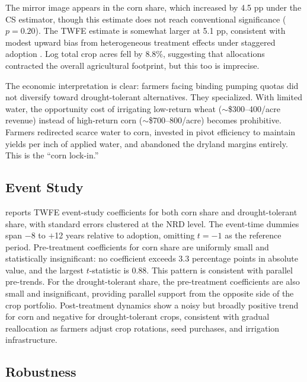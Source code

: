 \documentclass[12pt]{article}
\begin{document}
The mirror image appears in the corn share, which increased by 4.5 pp under the CS estimator, though this estimate does not reach conventional significance ($p = 0.20$). The TWFE estimate is somewhat larger at 5.1 pp, consistent with modest upward bias from heterogeneous treatment effects under staggered adoption \citep{goodmanbacon2021difference}. Log total crop acres fell by 8.8\%, suggesting that allocations contracted the overall agricultural footprint, but this too is imprecise.

The economic interpretation is clear: farmers facing binding pumping quotas did not diversify toward drought-tolerant alternatives. They specialized. With limited water, the opportunity cost of irrigating low-return wheat ($\sim$\$300--400/acre revenue) instead of high-return corn ($\sim$\$700--800/acre) becomes prohibitive. Farmers redirected scarce water to corn, invested in pivot efficiency to maintain yields per inch of applied water, and abandoned the dryland margins entirely. This is the ``corn lock-in.''

\subsection{Event Study}



 reports TWFE event-study coefficients for both corn share and drought-tolerant share, with standard errors clustered at the NRD level. The event-time dummies span $-$8 to $+$12 years relative to adoption, omitting $t = -1$ as the reference period. Pre-treatment coefficients for corn share are uniformly small and statistically insignificant: no coefficient exceeds 3.3 percentage points in absolute value, and the largest $t$-statistic is 0.88. This pattern is consistent with parallel pre-trends. For the drought-tolerant share, the pre-treatment coefficients are also small and insignificant, providing parallel support from the opposite side of the crop portfolio. Post-treatment dynamics show a noisy but broadly positive trend for corn and negative for drought-tolerant crops, consistent with gradual reallocation as farmers adjust crop rotations, seed purchases, and irrigation infrastructure.

\subsection{Robustness}


\end{document}
